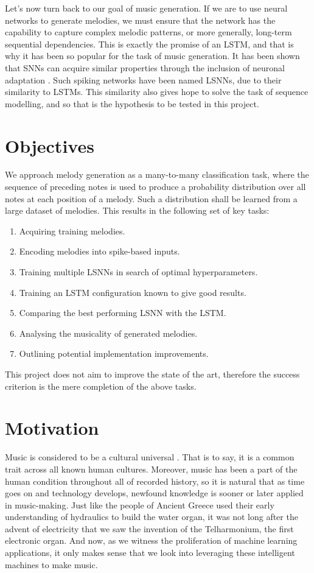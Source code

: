 \documentclass[../../report.tex]{subfiles}
\begin{document}
Let's now turn back to our goal of music generation. If we are to use neural
networks to generate melodies, we must ensure that the network has the
capability to capture complex melodic patterns, or more generally, long-term
sequential dependencies. This is exactly the promise of an LSTM, and that is why
it has been so popular for the task of music generation. It has been shown that
SNNs can acquire similar properties through the inclusion of neuronal adaptation
\cite{Bellec2018}. Such spiking networks have been named LSNNs, due to their
similarity to LSTMs. This similarity also gives hope to solve the task of
sequence modelling, and so that is the hypothesis to be tested in this project.

\section{Objectives}

We approach melody generation as a many-to-many classification task, where the
sequence of preceding notes is used to produce a probability distribution over
all notes at each position of a melody. Such a distribution shall be learned
from a large dataset of melodies. This results in the following set of key
tasks:

\begin{enumerate}
  \item Acquiring training melodies.
  \item Encoding melodies into spike-based inputs.
  \item Training multiple LSNNs in search of optimal hyperparameters.
  \item Training an LSTM configuration known to give good results.
  \item Comparing the best performing LSNN with the LSTM.
  \item Analysing the musicality of generated melodies.
  \item Outlining potential implementation improvements.
\end{enumerate}

This project does not aim to improve the state of the art, therefore the success
criterion is the mere completion of the above tasks.

\section{Motivation}

Music is considered to be a cultural universal \cite{Mehr2019}. That is to say,
it is a common trait across all known human cultures. Moreover, music has been a
part of the human condition throughout all of recorded history, so it is natural
that as time goes on and technology develops, newfound knowledge is sooner or
later applied in music-making. Just like the people of Ancient Greece used their
early understanding of hydraulics to build the water organ, it was not long
after the advent of electricity that we saw the invention of the Telharmonium,
the first electronic organ. And now, as we witness the proliferation of machine
learning applications, it only makes sense that we look into leveraging these
intelligent machines to make music.
\end{document}
